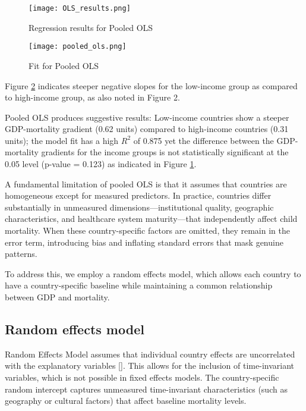 \documentclass[10pt,a4paper]{article}
\begin{document}
    \begin{figure}[H]
    \centering
    \begin{minipage}{0.7\textwidth}
        \centering
        \texttt{[image: OLS\_results.png]}
    \end{minipage}
    \caption{Regression results for Pooled OLS}
    \label{fig:ols_regression}
    \end{figure}
    
    \begin{figure}[H]
    \centering
    \begin{minipage}{0.7\textwidth}
        \centering
        \texttt{[image: pooled\_ols.png]}
    \end{minipage}
    \caption{Fit for Pooled OLS}
    \label{fig:ols_fit_plot}
    \end{figure}  

    Figure \ref{fig:ols_fit_plot} indicates steeper negative slopes for the low-income group as compared to high-income group, as also noted in Figure 2. 
    
   Pooled OLS produces suggestive results: Low-income countries show a steeper GDP-mortality gradient (0.62 units) compared to high-income countries (0.31 units); the model fit has a high $R^{2}$ of 0.875 yet the difference between the GDP-mortality gradients for the income groups is not statistically significant at the 0.05 level (p-value = 0.123) as indicated in Figure \ref{fig:ols_regression}.
   
   A fundamental limitation of pooled OLS is that it assumes that countries are homogeneous except for measured predictors. In practice, countries differ substantially in unmeasured dimensions—institutional quality, geographic characteristics, and healthcare system maturity—that independently affect child mortality. When these country-specific factors are omitted, they remain in the error term, introducing bias and inflating standard errors that mask genuine patterns.
   
   To address this, we employ a random effects model, which allows each country to have a country-specific baseline while maintaining a common relationship between GDP and mortality.

   \subsection{Random effects model}
   Random Effects Model assumes that individual country effects are uncorrelated with the explanatory variables [\cite{gelman2007,fitzmaurice2011}]. This allows for the inclusion of time-invariant variables, which is not possible in fixed effects models. The country-specific random intercept captures unmeasured time-invariant characteristics (such as geography or cultural factors) that affect baseline mortality levels.
\end{document}
